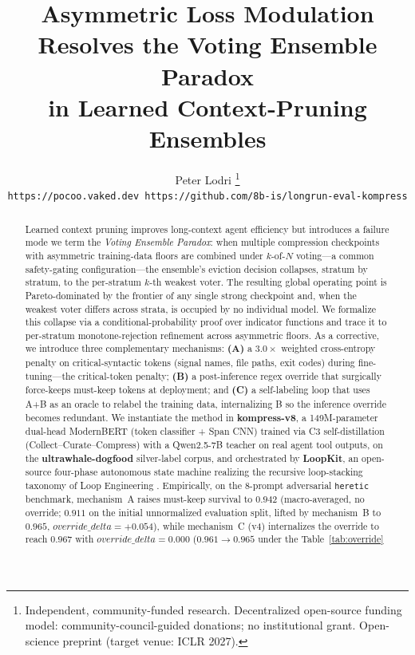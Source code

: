 \documentclass[10pt,letterpaper]{article}
\title{Asymmetric Loss Modulation Resolves the Voting Ensemble Paradox\\
       in Learned Context-Pruning Ensembles}
\author{Peter Lodri%
  \thanks{Independent, community-funded research. Decentralized open-source
  funding model: community-council-guided donations; no institutional grant.
  Open-science preprint (target venue: ICLR 2027).}%
  \\[2pt]
  \texttt{https://pocoo.vaked.dev \quad https://github.com/8b-is/longrun-eval-kompress}}
\date{}
\begin{document}
\maketitle

\begin{abstract}
Learned context pruning improves long-context agent efficiency but introduces
a failure mode we term the \emph{Voting Ensemble Paradox}: when multiple
compression checkpoints with asymmetric training-data floors are combined
under $k$-of-$N$ voting---a common safety-gating configuration---the
ensemble's eviction decision collapses, stratum by stratum, to the
per-stratum $k$-th weakest voter. The resulting global operating point is
Pareto-dominated by the frontier of any single strong checkpoint and, when
the weakest voter differs across strata, is occupied by no individual model.
We formalize this collapse via a conditional-probability proof over
indicator functions and trace it to per-stratum monotone-rejection
refinement across asymmetric floors. As a corrective, we introduce three
complementary mechanisms: \textbf{(A)} a $3.0\times$ weighted
cross-entropy penalty on critical-syntactic tokens (signal names, file
paths, exit codes) during fine-tuning---the critical-token penalty; \textbf{(B)}
a post-inference regex override that surgically force-keeps must-keep
tokens at deployment; and \textbf{(C)} a self-labeling loop that uses
A+B as an oracle to relabel the training data, internalizing B so the
inference override becomes redundant. We instantiate the method in
\textbf{kompress-v8}, a 149M-parameter dual-head ModernBERT (token
classifier + Span CNN) trained via C3 self-distillation
(Collect--Curate--Compress) with a Qwen2.5-7B teacher on real agent tool
outputs, on the \textbf{ultrawhale-dogfood} silver-label corpus, and
orchestrated by \textbf{LoopKit}, an open-source four-phase autonomous state
machine realizing the recursive loop-stacking taxonomy of Loop Engineering
\citep{osmani2026loop,greyling2026loop,langchain2026loops}. Empirically, on the 8-prompt adversarial \texttt{heretic} benchmark,
mechanism~A raises must-keep survival to $0.942$ (macro-averaged, no
override; $0.911$ on the initial unnormalized evaluation split, lifted by
mechanism~B to $0.965$, $\mathit{override\_delta}{=}{+}0.054$), while
mechanism~C (v4) internalizes the override to reach $0.967$ with
$\mathit{override\_delta}{=}0.000$ ($0.961\to0.965$ under the Table~\ref{tab:override}

\end{abstract}
\end{document}
